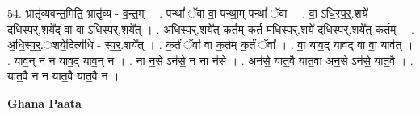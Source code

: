 \documentclass[17pt]{extarticle}
\begin{document}
54. भ्रातृ॑व्यवन्त॒मिति॒ भ्रातृ॑व्य - व॒न्त॒म् । . पन्थां᳚ ॅवा वा॒ पन्था॒म् पन्थां᳚ ॅवा । . वा॒ ऽधि॒स्प॒र्॒.शये॑ दधिस्प॒र्॒.शये᳚द् वा वा ऽधिस्प॒र्॒.शये᳚त् । . अ॒धि॒स्प॒र्॒.शये᳚त् क॒र्तम् क॒र्त म॑धिस्प॒र्॒.शये॑ दधिस्प॒र्॒.शये᳚त् क॒र्तम् । . अ॒धि॒स्प॒र्॒.॒शये॒दित्य॑धि - स्प॒र्॒.शये᳚त् । . क॒र्तं ॅवा॑ वा क॒र्तम् क॒र्तं ॅवा᳚ । . वा॒ याव॒द् याव॑द् वा वा॒ याव॑त् । . याव॒न् न न याव॒द् याव॒न् न । . ना न॒से ऽन॑से॒ न ना न॑से । . अन॑से॒ यात॒वै यात॒वा अन॒से ऽन॑से॒ यात॒वै । . यात॒वै न न यात॒वै यात॒वै न । \newline

\textbf{Ghana Paata } \newline
\end{document}
